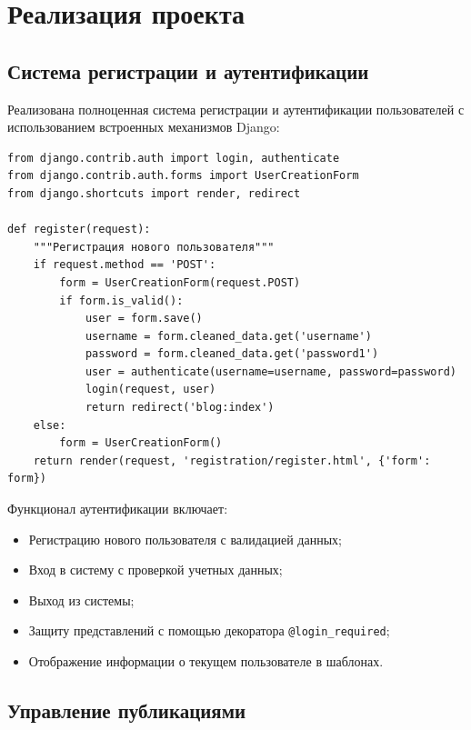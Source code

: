\documentclass[pract,och,bachelor]{SCWorks}
\begin{document}
\section{Реализация проекта}

\subsection{Система регистрации и аутентификации}

Реализована полноценная система регистрации и аутентификации пользователей с использованием встроенных механизмов Django:

\begin{listing}[H]
\begin{verbatim}
from django.contrib.auth import login, authenticate
from django.contrib.auth.forms import UserCreationForm
from django.shortcuts import render, redirect

def register(request):
    """Регистрация нового пользователя"""
    if request.method == 'POST':
        form = UserCreationForm(request.POST)
        if form.is_valid():
            user = form.save()
            username = form.cleaned_data.get('username')
            password = form.cleaned_data.get('password1')
            user = authenticate(username=username, password=password)
            login(request, user)
            return redirect('blog:index')
    else:
        form = UserCreationForm()
    return render(request, 'registration/register.html', {'form': form})
\end{verbatim}
\caption{Функция регистрации пользователя}
\end{listing}

Функционал аутентификации включает:
\begin{itemize}
    \item Регистрацию нового пользователя с валидацией данных;
    \item Вход в систему с проверкой учетных данных;
    \item Выход из системы;
    \item Защиту представлений с помощью декоратора \texttt{@login\_required};
    \item Отображение информации о текущем пользователе в шаблонах.
\end{itemize}

\subsection{Управление публикациями}
\end{document}
